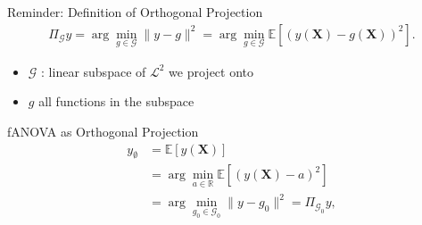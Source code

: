 
\begin{frame}{Reminder: Definition of Orthogonal Projection} %
  \begin{align*}
    \Pi_{\mathcal{G}}y = \arg\min_{g \in \mathcal{G}} \|y - g\|^2
= \arg\min_{g \in \mathcal{G}} \mathbb{E}[(y(\boldsymbol{X}) - g(\boldsymbol{X}))^2].
\end{align*}
  \begin{itemize}
    \item $\mathcal{G}$ : linear subspace of $\mathcal{L}^2$ we project onto
    \item $g$ all functions in the subspace
  \end{itemize}
\end{frame}

\begin{frame}{fANOVA as Orthogonal Projection} %
\begin{align*}
    y_{\emptyset}
    &= \mathbb{E}[y(\boldsymbol{X})] \\ 
    &= \arg \min_{a \in \mathbb{R}} \mathbb{E}[(y(\boldsymbol{X}) - a)^2] \\ 
    &= \arg \min_{g_0 \in \mathcal{G}_0} \|y - g_0\|^2
    = \Pi_{\mathcal{G}_0}y,
\end{align*}

\end{frame}

